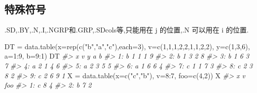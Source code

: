 \documentclass[
]{book}
\newenvironment{Shaded}{\begin{snugshade}}{\end{snugshade}}
\newcommand{\AttributeTok}[1]{\textcolor[rgb]{0.77,0.63,0.00}{#1}}
\newcommand{\CommentTok}[1]{\textcolor[rgb]{0.56,0.35,0.01}{\textit{#1}}}
\newcommand{\DecValTok}[1]{\textcolor[rgb]{0.00,0.00,0.81}{#1}}
\newcommand{\FunctionTok}[1]{\textcolor[rgb]{0.00,0.00,0.00}{#1}}
\newcommand{\NormalTok}[1]{#1}
\newcommand{\OtherTok}[1]{\textcolor[rgb]{0.56,0.35,0.01}{#1}}
\newcommand{\SpecialCharTok}[1]{\textcolor[rgb]{0.00,0.00,0.00}{#1}}
\newcommand{\StringTok}[1]{\textcolor[rgb]{0.31,0.60,0.02}{#1}}
\begin{document}
\hypertarget{ux7279ux6b8aux7b26ux53f7}{%
\subsection{特殊符号}\label{ux7279ux6b8aux7b26ux53f7}}

.SD,.BY,.N,.I,.NGRP和.GRP,.SDcols等,只能用在 j 的位置,.N 可以用在 i 的位置.

\begin{Shaded}
\begin{Highlighting}[]
\NormalTok{DT }\OtherTok{=} \FunctionTok{data.table}\NormalTok{(}\AttributeTok{x=}\FunctionTok{rep}\NormalTok{(}\FunctionTok{c}\NormalTok{(}\StringTok{"b"}\NormalTok{,}\StringTok{"a"}\NormalTok{,}\StringTok{"c"}\NormalTok{),}\AttributeTok{each=}\DecValTok{3}\NormalTok{), }\AttributeTok{v=}\FunctionTok{c}\NormalTok{(}\DecValTok{1}\NormalTok{,}\DecValTok{1}\NormalTok{,}\DecValTok{1}\NormalTok{,}\DecValTok{2}\NormalTok{,}\DecValTok{2}\NormalTok{,}\DecValTok{1}\NormalTok{,}\DecValTok{1}\NormalTok{,}\DecValTok{2}\NormalTok{,}\DecValTok{2}\NormalTok{), }\AttributeTok{y=}\FunctionTok{c}\NormalTok{(}\DecValTok{1}\NormalTok{,}\DecValTok{3}\NormalTok{,}\DecValTok{6}\NormalTok{), }\AttributeTok{a=}\DecValTok{1}\SpecialCharTok{:}\DecValTok{9}\NormalTok{, }\AttributeTok{b=}\DecValTok{9}\SpecialCharTok{:}\DecValTok{1}\NormalTok{)}
\NormalTok{DT}
\CommentTok{\#\textgreater{}    x v y a b}
\CommentTok{\#\textgreater{} 1: b 1 1 1 9}
\CommentTok{\#\textgreater{} 2: b 1 3 2 8}
\CommentTok{\#\textgreater{} 3: b 1 6 3 7}
\CommentTok{\#\textgreater{} 4: a 2 1 4 6}
\CommentTok{\#\textgreater{} 5: a 2 3 5 5}
\CommentTok{\#\textgreater{} 6: a 1 6 6 4}
\CommentTok{\#\textgreater{} 7: c 1 1 7 3}
\CommentTok{\#\textgreater{} 8: c 2 3 8 2}
\CommentTok{\#\textgreater{} 9: c 2 6 9 1}
\NormalTok{X }\OtherTok{=} \FunctionTok{data.table}\NormalTok{(}\AttributeTok{x=}\FunctionTok{c}\NormalTok{(}\StringTok{"c"}\NormalTok{,}\StringTok{"b"}\NormalTok{), }\AttributeTok{v=}\DecValTok{8}\SpecialCharTok{:}\DecValTok{7}\NormalTok{, }\AttributeTok{foo=}\FunctionTok{c}\NormalTok{(}\DecValTok{4}\NormalTok{,}\DecValTok{2}\NormalTok{))}
\NormalTok{X}
\CommentTok{\#\textgreater{}    x v foo}
\CommentTok{\#\textgreater{} 1: c 8   4}
\CommentTok{\#\textgreater{} 2: b 7   2}


\end{Highlighting}
\end{Shaded}
\end{document}
